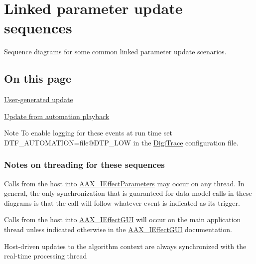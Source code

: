 \hypertarget{a00355}{}\section{Linked parameter update sequences}
\label{a00355}
Sequence diagrams for some common linked parameter update scenarios. 

\hypertarget{a00355_advancedTopics_linkedParameters_sequences_contents}{}\subsection{On this page}\label{a00355_advancedTopics_linkedParameters_sequences_contents}
\begin{DoxyItemize}
\item \hyperlink{a00355_linkedParameters_sequences_user_gui}{User-\/generated update} \item \hyperlink{a00355_linkedParameters_sequences_automation}{Update from automation playback}\end{DoxyItemize}
\begin{DoxyNote}{Note}
To enable logging for these events at run time set {\ttfamily D\+T\+F\+\_\+\+A\+U\+T\+O\+M\+A\+T\+I\+O\+N=file@D\+T\+P\+\_\+\+L\+O\+W} in the \hyperlink{a00364}{Digi\+Trace} configuration file.
\end{DoxyNote}
\hypertarget{a00355_advancedTopics_linkedParameters_sequences_notes}{}\subsubsection{Notes on threading for these sequences}\label{a00355_advancedTopics_linkedParameters_sequences_notes}

\begin{DoxyItemize}
\item Calls from the host into \hyperlink{a00099}{A\+A\+X\+\_\+\+I\+Effect\+Parameters} may occur on any thread. In general, the only synchronization that is guaranteed for data model calls in these diagrams is that the call will follow whatever event is indicated as its trigger.
\item Calls from the host into \hyperlink{a00098}{A\+A\+X\+\_\+\+I\+Effect\+G\+U\+I} will occur on the main application thread unless indicated otherwise in the \hyperlink{a00098}{A\+A\+X\+\_\+\+I\+Effect\+G\+U\+I} documentation.
\item Host-\/driven updates to the algorithm context are always synchronized with the real-\/time processing thread
\end{DoxyItemize}

